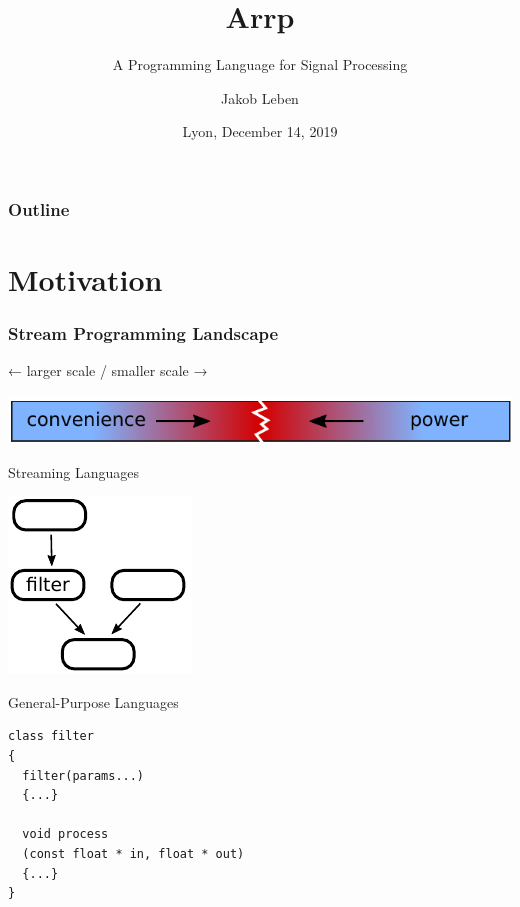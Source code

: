 \documentclass{beamer}
\title{Arrp}
\subtitle{A Programming Language for Signal Processing}
\author{Jakob Leben}
\institute{Limbic Media, Victoria, Canada}
\date{Lyon, December 14, 2019}
\begin{document}
\begin{frame}
\titlepage
\end{frame}

\begin{frame}
\frametitle{Outline}
\tableofcontents
\end{frame}

\section{Motivation}

\begin{frame}[t, fragile]
\frametitle{Stream Programming Landscape}

\begin{center}
← larger scale / smaller scale →

\includegraphics[width=\textwidth]{../figures/landscape_before_arrp}
\end{center}
\begin{minipage}[t]{0.48\linewidth}
Streaming Languages

\vspace{10pt}
\begin{center}
\includegraphics{../figures/stream-graph}
\end{center}
\end{minipage}\hfill
\begin{minipage}[t]{0.48\linewidth}
General-Purpose Languages

\vspace{10pt}
\small
\begin{BVerbatim}
class filter
{
  filter(params...)
  {...}

  void process
  (const float * in, float * out)
  {...}
}
\end{BVerbatim}
\end{minipage}
\end{frame}
\end{document}
